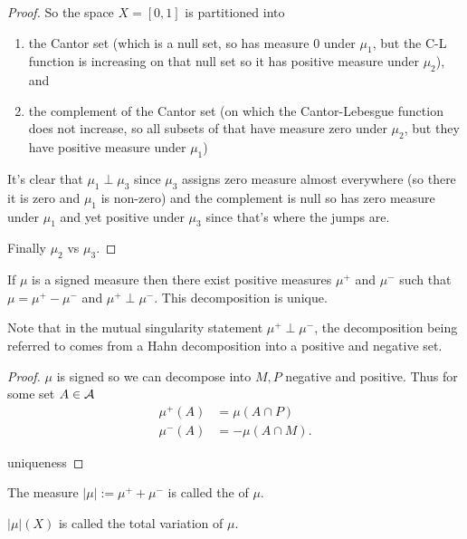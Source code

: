 \begin{example}
\begin{proof}
    So the space $X = [0, 1]$ is partitioned into
    \begin{enumerate}
    \item the Cantor set (which is a null set, so has measure $0$ under $\mu_1$, but the C-L
      function is increasing on that null set so it has positive measure under $\mu_2$), and
    \item the complement of the Cantor set (on which the Cantor-Lebesgue function does not
      increase, so all subsets of that have measure zero under $\mu_2$, but they have positive
      measure under $\mu_1$)
    \end{enumerate}
    It's clear that $\mu_1 \perp \mu_3$ since $\mu_3$ assigns zero measure almost everywhere (so
    there it is zero and $\mu_1$ is non-zero) and the complement is null so has zero measure
    under $\mu_1$ and yet positive under $\mu_3$ since that's where the jumps are.

    Finally $\mu_2$ vs $\mu_3$.

  \end{proof}

\end{example}

\begin{theorem}
  If $\mu$ is a signed measure then there exist positive measures $\mu^+$ and $\mu^-$ such
  that $\mu = \mu^+ - \mu^-$ and $\mu^+ \perp \mu^-$. This decomposition is unique.
\end{theorem}

\begin{intuition}
  Note that in the mutual singularity statement $\mu^+ \perp \mu^-$, the decomposition being
  referred to comes from a Hahn decomposition into a positive and negative set.
\end{intuition}

\begin{proof}
  $\mu$ is signed so we can decompose into $M, P$ negative and positive. Thus for some set $A \in \mathcal A$
  \begin{align*}
    \mu^+(A) &= \mu(A \cap P) \\
    \mu^-(A) &= -\mu(A \cap M).
  \end{align*}

   uniqueness
\end{proof}

\begin{definition}
  The measure $|\mu| := \mu^+ + \mu^-$ is called the  of $\mu$.

  $|\mu|(X)$ is called the total variation of $\mu$.
\end{definition}

